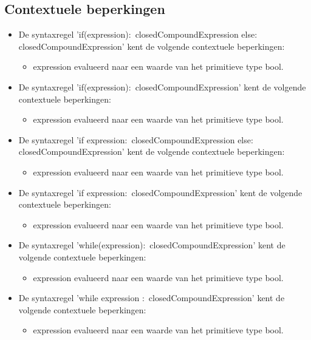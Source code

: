     \subsection{Contextuele beperkingen}
        \begin{itemize}
        \item De syntaxregel 'if(expression)$\colon$ closedCompoundExpression else$\colon$ closedCompoundExpression' kent de volgende contextuele beperkingen:
            \begin{itemize}
            \item expression evalueerd naar een waarde van het primitieve type bool.
            \end{itemize}
        \item De syntaxregel 'if(expression)$\colon$ closedCompoundExpression' kent de volgende contextuele beperkingen:
            \begin{itemize}
            \item expression evalueerd naar een waarde van het primitieve type bool.
            \end{itemize}
        \item De syntaxregel 'if expression$\colon$ closedCompoundExpression else$\colon$ closedCompoundExpression' kent de volgende contextuele beperkingen:
            \begin{itemize}
            \item expression evalueerd naar een waarde van het primitieve type bool.
            \end{itemize}
        \item De syntaxregel 'if expression$\colon$ closedCompoundExpression' kent de volgende contextuele beperkingen:
            \begin{itemize}
            \item expression evalueerd naar een waarde van het primitieve type bool.
            \end{itemize}
        \item De syntaxregel 'while(expression)$\colon$ closedCompoundExpression' kent de volgende contextuele beperkingen:
            \begin{itemize}
            \item expression evalueerd naar een waarde van het primitieve type bool.
            \end{itemize}
        \item De syntaxregel 'while expression $\colon$ closedCompoundExpression' kent de volgende contextuele beperkingen:
            \begin{itemize}
            \item expression evalueerd naar een waarde van het primitieve type bool.
            \end{itemize}
        \end{itemize}

